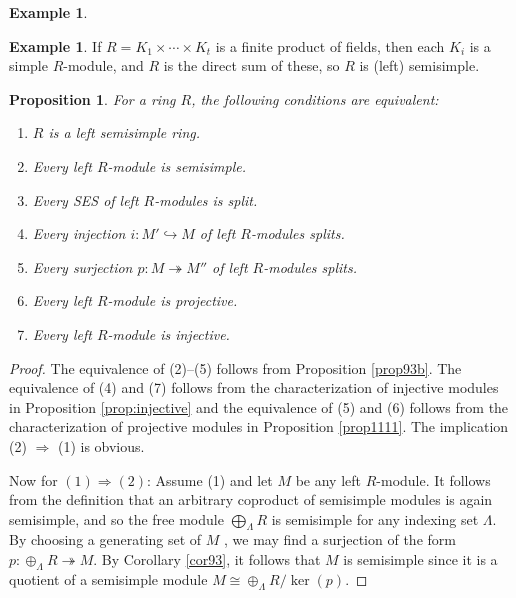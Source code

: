 \documentclass{amsart}[12pt]
\def\ker{\operatorname{ker}}
\newcommand{\onto}{\twoheadrightarrow}
\numberwithin{equation}{section}
\theoremstyle{plain} %
\newtheorem{prop}[equation]{Proposition}
\theoremstyle{definition}
\newtheorem{ex}[equation]{Example}
\theoremstyle{remark}
\begin{document}
\begin{ex}
\begin{ex} If $R=K_1 \times \cdots \times K_t$ is a finite product of fields, then each $K_i$ is a simple $R$-module, and $R$ is the direct sum of these, so $R$ is (left) semisimple.
\end{ex}



  \begin{prop} \label{prop916} For a ring $R$, the following conditions are equivalent:
    \begin{enumerate}
    \item $R$ is a left semisimple ring.
      \item Every left $R$-module is semisimple.
      \item Every SES of left $R$-modules is split.
      \item Every injection $i: M' \hookrightarrow M$ of left $R$-modules splits.
      \item Every surjection $p: M \onto M''$ of left $R$-modules splits.        
          \item Every left $R$-module is projective.
      \item Every left $R$-module is injective.
      \end{enumerate}
\end{prop}



    \begin{proof} The equivalence of (2)--(5) follows from Proposition \ref{prop93b}. The equivalence of (4) and (7) follows from the characterization of injective modules in Proposition \ref{prop:injective} and the equivalence of (5) and (6) follows from the characterization of projective modules in Proposition \ref{prop1111}.
        The implication (2) $\Rightarrow$ (1) is obvious.

        Now for $(1)\Rightarrow (2)$: Assume (1) and let $M$ be any left $R$-module.
        It follows from the definition that an arbitrary coproduct of semisimple modules is again semisimple, and so the free module $\bigoplus_\Lambda R$ is semisimple for any indexing set $\Lambda$. By choosing a generating set of $M$ , we may find a surjection of the form $p: \oplus_\Lambda R \onto M$. By Corollary \ref{cor93},
        it follows that $M$ is semisimple since it is a quotient of a semisimple module $M\cong \oplus_\Lambda R/\ker(p)$.
      \end{proof}

\begin{comment}
      \begin{prop} Let $R$ be a left semisimple ring and write  $R = I_1 \oplus \cdots \oplus I_m$ as an internal direct sum with $I_1, \dots, I_m$ minimal
        left ideals. 
Let $J_1, \dots, J_n$ be a complete list of representatives of isomorphism classes as left $R$-modules
taken from the list $I_1, \dots, I_m$; so, for each $i$ with $1 \leq i \leq m$, there is a unique $j$ with $1 \leq j \leq l$ so
that $I_i \cong J_j$ as left $R$-modules.


\end{comment}
\end{ex}
\end{document}
